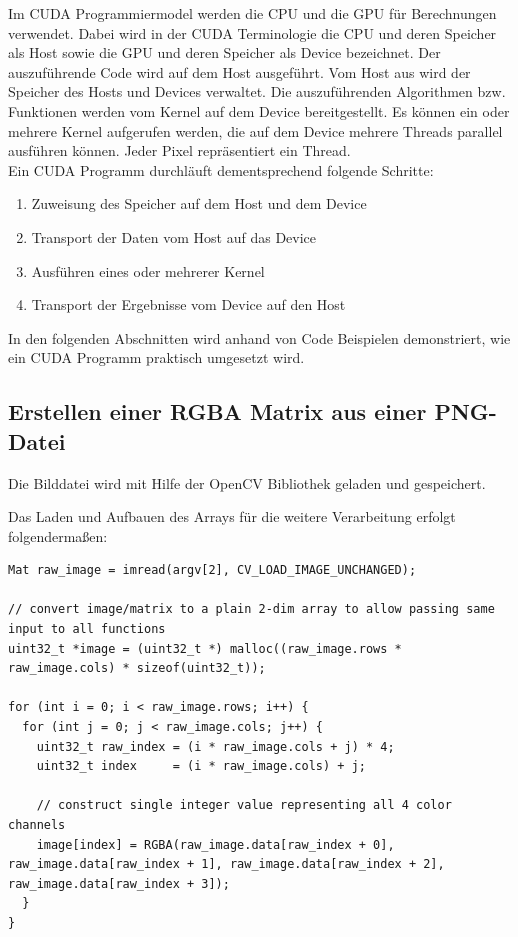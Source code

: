 \documentclass{llncs}
\begin{document}
Im CUDA Programmiermodel werden die CPU und die GPU für Berechnungen verwendet. Dabei wird in der CUDA Terminologie die CPU und deren Speicher als Host sowie die GPU und deren Speicher als Device bezeichnet. Der auszuführende Code wird auf dem Host ausgeführt. Vom Host aus wird der Speicher des Hosts und Devices verwaltet. Die auszuführenden Algorithmen bzw. Funktionen werden vom Kernel auf dem Device bereitgestellt. Es können ein oder mehrere Kernel aufgerufen werden, die auf dem Device mehrere Threads parallel ausführen können. Jeder Pixel repräsentiert ein Thread.\\
\newpage
Ein CUDA Programm durchläuft dementsprechend folgende Schritte:
\begin{enumerate}
	\item Zuweisung des Speicher auf dem Host und dem Device
	\item Transport der Daten vom Host auf das Device
	\item Ausführen eines oder mehrerer Kernel
	\item Transport der Ergebnisse vom Device auf den Host
\end{enumerate}

In den folgenden Abschnitten wird anhand von Code Beispielen demonstriert, wie ein CUDA Programm praktisch umgesetzt wird.\\

%
\subsection{Erstellen einer RGBA Matrix aus einer PNG-Datei}
%
Die Bilddatei wird mit Hilfe der OpenCV Bibliothek geladen und gespeichert.

Das Laden und Aufbauen des Arrays für die weitere Verarbeitung erfolgt folgendermaßen:

\begin{lstlisting}
Mat raw_image = imread(argv[2], CV_LOAD_IMAGE_UNCHANGED);

// convert image/matrix to a plain 2-dim array to allow passing same input to all functions
uint32_t *image = (uint32_t *) malloc((raw_image.rows * raw_image.cols) * sizeof(uint32_t));

for (int i = 0; i < raw_image.rows; i++) {
  for (int j = 0; j < raw_image.cols; j++) {
    uint32_t raw_index = (i * raw_image.cols + j) * 4;
    uint32_t index     = (i * raw_image.cols) + j;

    // construct single integer value representing all 4 color channels
    image[index] = RGBA(raw_image.data[raw_index + 0], raw_image.data[raw_index + 1], raw_image.data[raw_index + 2], raw_image.data[raw_index + 3]);
  }
}
\end{lstlisting}
\newpage
%
\end{document}
